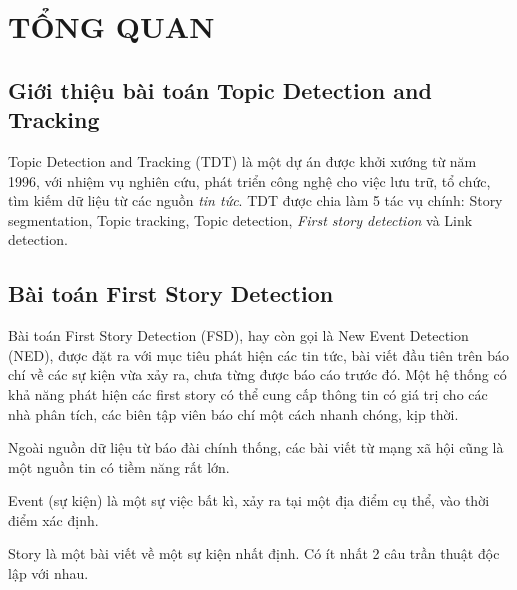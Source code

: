 \chapter{TỔNG QUAN}
\ifpdf
    \graphicspath{{Chapter2/Chapter2Figs/PNG/}{Chapter2/Chapter2Figs/PDF/}{Chapter2/Chapter2Figs/}}
\else
    \graphicspath{{Chapter2/Chapter2Figs/EPS/}{Chapter2/Chapter2Figs/}}
\fi

\section{Giới thiệu bài toán Topic Detection and Tracking}
Topic Detection and Tracking (TDT) là một dự án được khởi xướng từ năm 1996, với nhiệm vụ nghiên cứu, phát triển công nghệ cho việc lưu trữ, tổ chức, tìm kiếm dữ liệu từ các nguồn \textit{tin tức}. TDT được chia làm 5 tác vụ chính: Story segmentation, Topic tracking, Topic detection, \textit{First story detection} và Link detection.

\section{Bài toán First Story Detection}
Bài toán First Story Detection (FSD), hay còn gọi là New Event Detection (NED), được đặt ra với mục tiêu phát hiện các tin tức, bài viết đầu tiên trên báo chí về các sự kiện vừa xảy ra, chưa từng được báo cáo trước đó. Một hệ thống có khả năng phát hiện các first story có thể cung cấp thông tin có giá trị cho các nhà phân tích, các biên tập viên báo chí một cách nhanh chóng, kịp thời.

Ngoài nguồn dữ liệu từ báo đài chính thống, các bài viết từ mạng xã hội cũng là một nguồn tin có tiềm năng rất lớn. 

	\begin{definition}
		Event (sự kiện) là một sự việc bất kì, xảy ra tại một địa điểm cụ thể, vào thời điểm xác định.
	\end{definition}
	\begin{definition}
		Story là một bài viết về một sự kiện nhất định. Có ít nhất 2 câu trần thuật độc lập với nhau.
	\end{definition}


